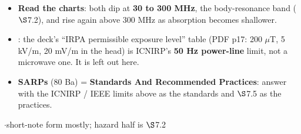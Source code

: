 \par{}

\par{}
\begin{itemize}
  \item \textbf{Read the charts}: both dip at \textbf{30 to 300 MHz}, the body-resonance band
    ($\S$7.2), and rise again above 300 MHz as absorption becomes shallower.
  \item {}: the deck's ``IRPA permissible exposure level'' table (PDF p17: 200
    $\mu$T, 5 kV/m, 20 mV/m in the head) is ICNIRP's \textbf{50 Hz power-line} limit, not a
    microwave one. It is left out here. \added{}
  \item \textbf{SARPs} (80 Ba) = \textbf{Standards And Recommended Practices}: answer with the
    ICNIRP / IEEE limits above as the standards and $\S$7.5 as the practices.
\end{itemize}

\vspace{2pt}


{\color{sub}\footnotesize {}  \gap$\cdot$\gap short-note form mostly; hazard half is $\S$7.2}

